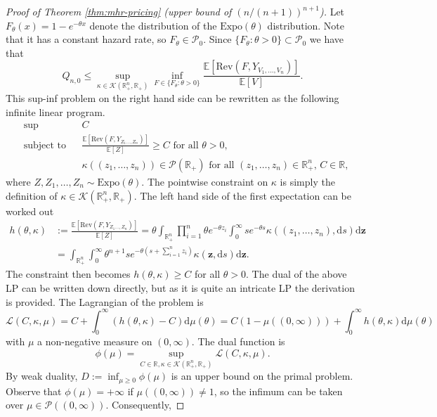 \documentclass[11pt]{article}
\newcommand{\E}{\mathbb{E}}
\newcommand{\Rplus}{\mathbb{R}_+}
\newcommand{\dd}{\mathrm{d}}
\newcommand{\Expo}{\mathrm{Expo}}
\newcommand{\Rev}{\mathrm{Rev}}
\begin{document}
\begin{proof}[Proof of Theorem \ref{thm:mhr-pricing} (upper bound of $(n/(n+1))^{n+1}$)]

Let $F_\theta(x)=1-e^{-\theta x}$ denote the distribution of the $\Expo(\theta)$ distribution. Note that it has a constant hazard rate, so $F_\theta\in\mathcal{P}_0$. Since $\{F_{\theta}:\theta>0\}\subset\mathcal{P}_0$ we have that
$$
Q_{n,0}\le\sup_{\kappa\in \mathcal{K}(\Rplus^n,\Rplus)}\inf_{F\in\{F_{\theta}:\theta>0\}}\frac{\E[\Rev(F,Y_{V_1,\dots,V_n})]}{\E[V]}.
$$
This sup-inf problem on the right hand side can be rewritten as the following infinite linear program.
    \begin{align*}
        &\sup && C\\
        &\text{subject to} &&\frac{\E[\Rev(F,Y_{Z_1\dots,Z_n})]}{\E[Z]}\ge C\text{ for all } \theta>0,
        \\
        &&& \kappa((z_1,\dots,z_n))\in\mathcal{P}(\mathbb{R}_+)\text{ for all }(z_1,\dots,z_n)\in\mathbb{R}_+^n\text{, } C\in\mathbb{R},
    \end{align*}
where $Z,Z_1,\dots,Z_n\sim \Expo(\theta)$.
    The pointwise constraint on $\kappa$ is simply the definition of $\kappa\in\mathcal{K}(\mathbb{R}_+^n,\mathbb{R}_+)$.
    The left hand side of the first expectation can be worked out
    \begin{align*}
        h(\theta,\kappa)&:=\frac{\E[\Rev(F,Y_{Z_1\dots,Z_n})]}{\E[Z]}=\theta \int_{\mathbb{R}_+^n}\prod_{i=1}^n\theta e^{-\theta z_i}\int_0^\infty se^{-\theta s} \kappa((z_1,\dots,z_n), \dd s)\dd \boldsymbol{z}\\
        &=\int_{\mathbb{R}^n_+}\int_0^\infty\theta^{n+1}se^{-\theta\left(s+\sum_{i=1}^nz_i\right)} \kappa(\boldsymbol{z},\dd s)\dd \boldsymbol{z}.
    \end{align*}
    The constraint then becomes $h(\theta,\kappa)\ge C$ for all $\theta>0$. The dual of the above LP can be written down directly, but as it is quite an intricate LP the derivation is provided.
    The Lagrangian of the problem is 
    $$\mathcal{L}(C,\kappa,\mu)=C+\int_0^\infty (h(\theta,\kappa)-C)\dd \mu(\theta)=C(1-\mu((0,\infty)))+\int_0^\infty h(\theta,\kappa)\dd \mu(\theta)$$
    with $\mu$ a non-negative measure on $(0,\infty)$. 
    The dual function is $$\phi(\mu)=\sup_{C\in\mathbb{R},\kappa\in\mathcal{K}(\mathbb{R}^n_+,\mathbb{R}_+)}\mathcal{L}(C,\kappa,\mu).$$
    By weak duality, $D :=\inf_{\mu\ge 0}\phi(\mu)$ is an upper bound on the primal problem. Observe that $\phi(\mu)=+\infty$ if $\mu((0,\infty))\ne1$, so the infimum can be taken over $\mu\in\mathcal{P}((0,\infty))$. Consequently,

\end{proof}
\end{document}
